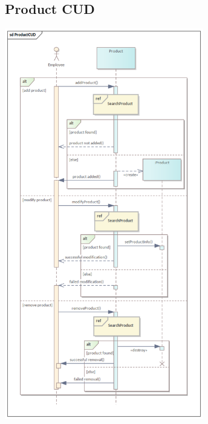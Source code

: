 \subsection{Product CUD}
\begin{center}
  \includegraphics[width=0.65\textwidth]{immagini/Analisi/SequenceDiagrams/ProductCUD.png}
\end{center}

